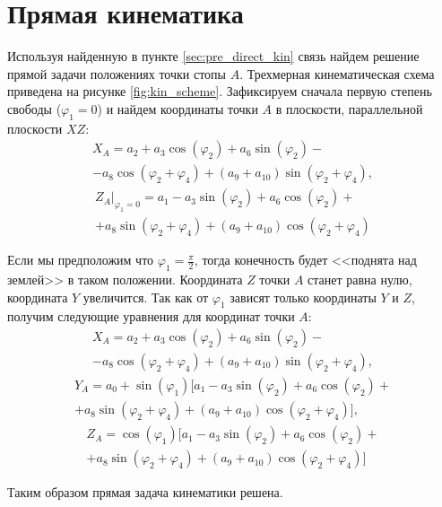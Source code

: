 \section{Прямая кинематика}\label{sec:direct_kinematics}
Используя найденную в пункте \ref{sec:pre_direct_kin} связь найдем решение прямой задачи положениях точки стопы $ A $. Трехмерная кинематическая схема приведена на рисунке \ref{fig:kin_scheme}. Зафиксируем сначала первую степень свободы ($ \varphi_1 = 0 $) и найдем координаты точки $ A $ в плоскости, параллельной плоскости $ XZ $:
\begin{multline}
    X_A=a_2+a_3\cos(\varphi_2)+a_6\sin(\varphi_2)-\\-a_8 \cos(\varphi _2+\varphi _4)+(a_9+a_{10}) \sin(\varphi _2+\varphi _4) ,
\end{multline}
\begin{multline} %
    Z_A\Bigr|_{\varphi_1=0} =a_1-a_3 \sin(\varphi _2)+a_6 \cos(\varphi _2)+\\+a_8 \sin(\varphi _2+\varphi _4)+(a_9+a_{10}) \cos(\varphi _2+\varphi _4)
\end{multline}

\noindent Если мы предположим что $ \varphi_1 = \frac \pi 2 $, тогда конечность будет <<поднята над землей>> в таком положении. Координата $ Z $ точки $ A $ станет равна нулю, координата $ Y $ увеличится. Так как от $ \varphi_1 $ зависят только координаты $Y$ и $Z$, получим следующие уравнения для координат точки $A$:
\begin{multline}
    X_A=a_2+a_3\cos(\varphi_2)+a_6\sin(\varphi_2)-\\-a_8 \cos(\varphi _2+\varphi _4)+(a_9+a_{10}) \sin(\varphi _2+\varphi _4) ,
\end{multline}
\begin{multline}
    Y_A=a_0+\sin(\varphi_1)[a_1-a_3 \sin(\varphi _2)+a_6 \cos(\varphi _2)+\\+a_8 \sin(\varphi _2+\varphi _4)+(a_9+a_{10}) \cos(\varphi _2+\varphi _4)] ,
\end{multline}
\begin{multline}
    Z_A=\cos(\varphi_1)[a_1-a_3 \sin(\varphi _2)+a_6 \cos(\varphi _2)+\\+a_8 \sin(\varphi _2+\varphi _4)+(a_9+a_{10}) \cos(\varphi _2+\varphi _4)]
\end{multline}

\noindent Таким образом прямая задача кинематики решена.

